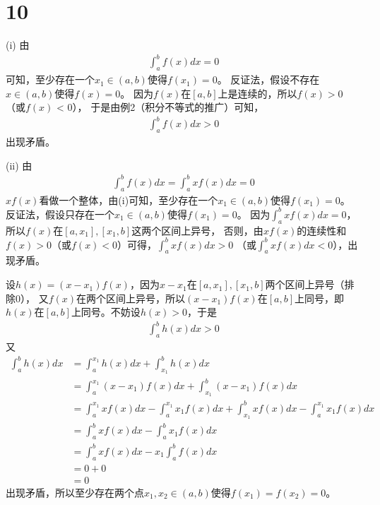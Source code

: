 \documentclass{article}
\begin{document}
\section*{10}

 (i)
由\begin{align*}
  \int_{a}^{b} f(x) dx = 0
\end{align*}
可知，至少存在一个$x_1 \in (a, b)$使得$f(x_1) = 0$。
反证法，假设不存在$x \in (a, b)$使得$f(x) = 0$。
因为$f(x)$在$[a,b]$上是连续的，所以$f(x) > 0$（或$f(x)$ < 0），
于是由例2（积分不等式的推广）可知，
\begin{align*}
  \int_{a}^{b} f(x) dx > 0
\end{align*}
出现矛盾。

(ii)
由
\begin{align*}
  \int_{a}^{b} f(x) dx = \int_{a}^{b} xf(x) dx = 0
\end{align*}
$xf(x)$看做一个整体，由(i)可知，至少存在一个$x_1 \in (a, b)$使得$f(x_1) = 0$。
反证法，假设只存在一个$x_1 \in (a, b)$使得$f(x_1) = 0$。
因为$\int_{a}^{b} xf(x) dx = 0$，所以$f(x)$在$[a, x_1], [x_1, b]$这两个区间上异号，
否则，由$xf(x)$的连续性和$f(x) > 0$（或$f(x) < 0$）可得，$\int_{a}^{b} xf(x) dx > 0$
（或$\int_{a}^{b} xf(x) dx < 0$），出现矛盾。

设$h(x) = (x - x_1)f(x)$，因为$x - x_1$在$[a, x_1], [x_1, b]$两个区间上异号（排除0），
又$f(x)$在两个区间上异号，所以$(x - x_1)f(x)$在$[a, b]$上同号，即
$h(x)$在$[a, b]$上同号。不妨设$h(x) > 0$，于是
\begin{align*}
  \int_{a}^{b} h(x) dx > 0
\end{align*}
又
\begin{align*}
  \int_{a}^{b} h(x) dx
   & = \int_{a}^{x_1} h(x) dx + \int_{x_1}^{b} h(x) dx                   \\
   & = \int_{a}^{x_1} (x - x_1)f(x) dx + \int_{x_1}^{b} (x - x_1)f(x) dx \\
   & = \int_{a}^{x_1} xf(x) dx - \int_{a}^{x_1} x_1f(x) dx
  + \int_{x_1}^{b} xf(x) dx - \int_{a}^{x_1} x_1f(x) dx                  \\
   & = \int_{a}^{b} xf(x) dx - \int_{a}^{b} x_1f(x) dx                   \\
   & = \int_{a}^{b} xf(x) dx - x_1 \int_{a}^{b} f(x) dx                  \\
   & = 0 + 0                                                             \\
   & = 0
\end{align*}
出现矛盾，所以至少存在两个点$x_1, x_2 \in (a, b)$使得$f(x_1) = f(x_2) = 0$。
\end{document}
